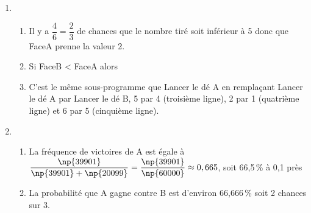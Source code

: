 \begin{enumerate}[resume]
\item 
	\begin{enumerate}
		\item %
		Il y a $\dfrac{4}{6} = \dfrac{2}{3}$ de chances que le nombre tiré soit inférieur à 5 donc que FaceA prenne la valeur 2.
		\item %
Si FaceB < FaceA alors
		\item %
C'est le même sous-programme que Lancer le dé A en remplaçant Lancer le dé A par Lancer le dé B, 5 par 4 (troisième ligne), 2 par 1 (quatrième ligne) et 6 par 5 (cinquième ligne).
	\end{enumerate}
\item  %
	
	\begin{enumerate}
		\item %
La fréquence de victoires de A est égale à $\dfrac{\np{39901}}{\np{39901} + \np{20099}} = \dfrac{\np{39901}}{\np{60000}}\approx 0,665$, soit 66,5\,\% à 0,1 près
		\item %
La probabilité que A gagne contre B est d'environ 66,666\,\% soit 2 chances sur 3.
	\end{enumerate}
\end{enumerate}
